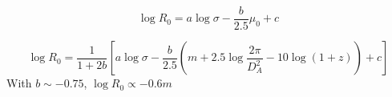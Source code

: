 \documentclass[iop]{emulateapj}
\newcommand{\Sersic}{S\'ersic}
\begin{document}
\begin{equation}
    \log R_0 = a \log \sigma - \frac{b}{2.5} \mu_0 + c
\end{equation}

\begin{equation}
    \log R_0 = \frac{1}{1 + 2 b} \left[ a\log \sigma
        - \frac{b}{2.5} \left(m + 2.5\log \frac{2\pi}{D_A^2} - 10 \log (1+z)\right)
        + c \right]
\end{equation}
With $b \sim -0.75$, $\log R_0 \propto -0.6 m$





\end{document}
